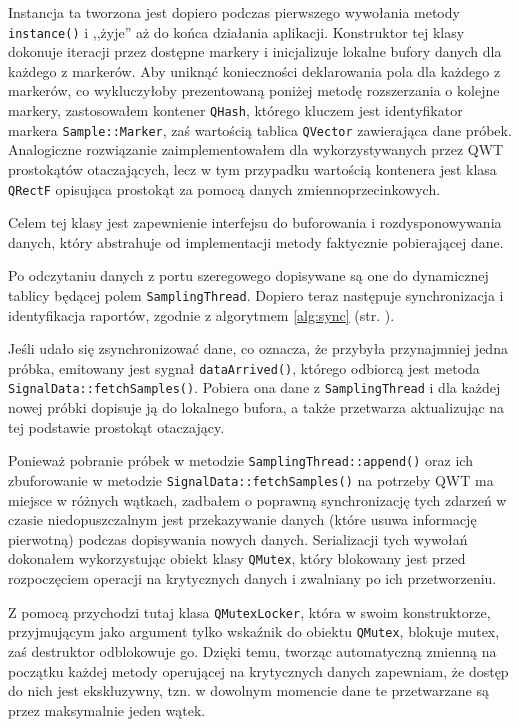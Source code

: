 Instancja ta tworzona jest dopiero podczas pierwszego wywołania metody \verb|instance()| i ,,żyje'' aż do końca działania aplikacji. Konstruktor tej klasy dokonuje iteracji przez dostępne markery i inicjalizuje lokalne bufory danych dla każdego z markerów. Aby uniknąć konieczności deklarowania pola dla każdego z markerów, co wykluczyłoby prezentowaną poniżej metodę rozszerzania o kolejne markery, zastosowałem kontener \verb|QHash|, którego kluczem jest identyfikator markera \verb|Sample::Marker|, zaś wartością tablica \verb|QVector| zawierająca dane próbek. Analogiczne rozwiązanie zaimplementowałem dla wykorzystywanych przez \textsc{QWT} prostokątów otaczających, lecz w tym przypadku wartością kontenera jest klasa \verb|QRectF| opisująca prostokąt za pomocą danych zmiennoprzecinkowych.

Celem tej klasy jest zapewnienie interfejsu do buforowania i rozdysponowywania danych, który abstrahuje od implementacji metody faktycznie pobierającej dane.

Po odczytaniu danych z portu szeregowego dopisywane są one do dynamicznej tablicy będącej polem \verb|SamplingThread|. Dopiero teraz następuje synchronizacja i identyfikacja raportów, zgodnie z algorytmem \ref{alg:sync} (str. \pageref{alg:sync}).

Jeśli udało się zsynchronizować dane, co oznacza, że przybyła przynajmniej jedna próbka, emitowany jest sygnał \verb|dataArrived()|, którego odbiorcą jest metoda \verb|SignalData::fetchSamples()|. Pobiera ona dane z \verb|SamplingThread| i dla każdej nowej próbki dopisuje ją do lokalnego bufora, a także przetwarza aktualizując na tej podstawie prostokąt otaczający.

Ponieważ pobranie próbek w metodzie \verb|SamplingThread::append()| oraz ich zbuforowanie w metodzie \verb|SignalData::fetchSamples()| na potrzeby \textsc{QWT} ma miejsce w różnych wątkach, zadbałem o poprawną synchronizację tych zdarzeń w czasie \ppauza niedopuszczalnym jest przekazywanie danych (które usuwa informację pierwotną) podczas dopisywania nowych danych. Serializacji tych wywołań dokonałem wykorzystując obiekt klasy \verb|QMutex|, który blokowany jest przed rozpoczęciem operacji na krytycznych danych i zwalniany po ich przetworzeniu.

Z pomocą przychodzi tutaj klasa \verb|QMutexLocker|, która w swoim konstruktorze, przyjmującym jako argument tylko wskaźnik do obiektu \verb|QMutex|, blokuje mutex, zaś destruktor odblokowuje go. Dzięki temu, tworząc automatyczną zmienną na początku każdej metody operującej na krytycznych danych zapewniam, że dostęp do nich jest ekskluzywny, tzn. w dowolnym momencie dane te przetwarzane są przez maksymalnie jeden wątek.

